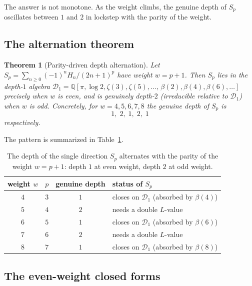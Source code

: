 \documentclass[11pt]{article}
\theoremstyle{plain}
\newtheorem{theorem}{Theorem}
\theoremstyle{remark}
\begin{document}
The answer is not monotone. As the weight climbs, the genuine depth of $S_p$ oscillates between $1$ and $2$ in lockstep with the parity of the weight.

\subsection{The alternation theorem}

\begin{theorem}[Parity-driven depth alternation]
\label{thm:alternation}
Let $S_p = \sum_{n\ge0} (-1)^n H_n /(2n+1)^{p}$ have weight $w=p+1$. Then $S_p$ lies in the depth-$1$ algebra $\mathcal{D}_1 = \mathbb{Q}\!\left[\pi,\log 2,\zeta(3),\zeta(5),\dots,\,\beta(2),\beta(4),\beta(6),\dots\right]$ precisely when $w$ is even, and is genuinely depth-$2$ (irreducible relative to $\mathcal{D}_1$) when $w$ is odd. Concretely, for $w = 4,5,6,7,8$ the genuine depth of $S_p$ is
\[
  \boxed{\;1,\; 2,\; 1,\; 2,\; 1\;}
\]
respectively.
\end{theorem}

The pattern is summarized in Table~\ref{tab:depth}.

\begin{table}[h]
\centering
\begin{tabular}{c c c l}
\hline
weight $w$ & $p$ & genuine depth & status of $S_p$ \\
\hline
$4$ & $3$ & $1$ & closes on $\mathcal{D}_1$ (absorbed by $\beta(4)$) \\
$5$ & $4$ & $2$ & needs a double $L$-value \\
$6$ & $5$ & $1$ & closes on $\mathcal{D}_1$ (absorbed by $\beta(6)$) \\
$7$ & $6$ & $2$ & needs a double $L$-value \\
$8$ & $7$ & $1$ & closes on $\mathcal{D}_1$ (absorbed by $\beta(8)$) \\
\hline
\end{tabular}
\caption{The depth of the single direction $S_p$ alternates with the parity of the weight $w=p+1$: depth $1$ at even weight, depth $2$ at odd weight.}
\label{tab:depth}
\end{table}

\subsection{The even-weight closed forms}
\end{document}
